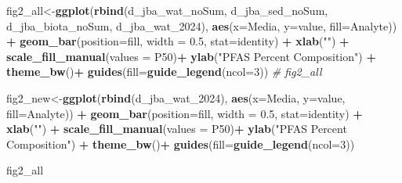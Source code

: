 \documentclass[
]{article}
\newenvironment{Shaded}{\begin{snugshade}}{\end{snugshade}}
\newcommand{\AttributeTok}[1]{\textcolor[rgb]{0.13,0.29,0.53}{#1}}
\newcommand{\CommentTok}[1]{\textcolor[rgb]{0.56,0.35,0.01}{\textit{#1}}}
\newcommand{\DecValTok}[1]{\textcolor[rgb]{0.00,0.00,0.81}{#1}}
\newcommand{\FloatTok}[1]{\textcolor[rgb]{0.00,0.00,0.81}{#1}}
\newcommand{\FunctionTok}[1]{\textcolor[rgb]{0.13,0.29,0.53}{\textbf{#1}}}
\newcommand{\NormalTok}[1]{#1}
\newcommand{\OtherTok}[1]{\textcolor[rgb]{0.56,0.35,0.01}{#1}}
\newcommand{\SpecialCharTok}[1]{\textcolor[rgb]{0.81,0.36,0.00}{\textbf{#1}}}
\newcommand{\StringTok}[1]{\textcolor[rgb]{0.31,0.60,0.02}{#1}}
\begin{document}
\begin{Shaded}
\begin{Highlighting}[]
\NormalTok{fig2\_all}\OtherTok{\textless{}{-}}\FunctionTok{ggplot}\NormalTok{(}\FunctionTok{rbind}\NormalTok{(d\_jba\_wat\_noSum,}
\NormalTok{                       d\_jba\_sed\_noSum,}
\NormalTok{                       d\_jba\_biota\_noSum,}
\NormalTok{                       d\_jba\_wat\_2024),}
       \FunctionTok{aes}\NormalTok{(}\AttributeTok{x=}\NormalTok{Media, }\AttributeTok{y=}\NormalTok{value, }\AttributeTok{fill=}\NormalTok{Analyte)) }\SpecialCharTok{+} 
  \FunctionTok{geom\_bar}\NormalTok{(}\AttributeTok{position=}\StringTok{\textquotesingle{}fill\textquotesingle{}}\NormalTok{, }\AttributeTok{width =} \FloatTok{0.5}\NormalTok{, }\AttributeTok{stat=}\StringTok{\textquotesingle{}identity\textquotesingle{}}\NormalTok{) }\SpecialCharTok{+}
  \FunctionTok{xlab}\NormalTok{(}\StringTok{""}\NormalTok{) }\SpecialCharTok{+}
  \FunctionTok{scale\_fill\_manual}\NormalTok{(}\AttributeTok{values =}\NormalTok{ P50)}\SpecialCharTok{+}
  \FunctionTok{ylab}\NormalTok{(}\StringTok{"PFAS Percent Composition"}\NormalTok{) }\SpecialCharTok{+}
  \FunctionTok{theme\_bw}\NormalTok{()}\SpecialCharTok{+}
  \FunctionTok{guides}\NormalTok{(}\AttributeTok{fill=}\FunctionTok{guide\_legend}\NormalTok{(}\AttributeTok{ncol=}\DecValTok{3}\NormalTok{))}
\CommentTok{\# fig2\_all}

\NormalTok{fig2\_new}\OtherTok{\textless{}{-}}\FunctionTok{ggplot}\NormalTok{(}\FunctionTok{rbind}\NormalTok{(d\_jba\_wat\_2024),}
       \FunctionTok{aes}\NormalTok{(}\AttributeTok{x=}\NormalTok{Media, }\AttributeTok{y=}\NormalTok{value, }\AttributeTok{fill=}\NormalTok{Analyte)) }\SpecialCharTok{+} 
  \FunctionTok{geom\_bar}\NormalTok{(}\AttributeTok{position=}\StringTok{\textquotesingle{}fill\textquotesingle{}}\NormalTok{, }\AttributeTok{width =} \FloatTok{0.5}\NormalTok{, }\AttributeTok{stat=}\StringTok{\textquotesingle{}identity\textquotesingle{}}\NormalTok{) }\SpecialCharTok{+}
  \FunctionTok{xlab}\NormalTok{(}\StringTok{""}\NormalTok{) }\SpecialCharTok{+}
  \FunctionTok{scale\_fill\_manual}\NormalTok{(}\AttributeTok{values =}\NormalTok{ P50)}\SpecialCharTok{+}
  \FunctionTok{ylab}\NormalTok{(}\StringTok{"PFAS Percent Composition"}\NormalTok{) }\SpecialCharTok{+}
  \FunctionTok{theme\_bw}\NormalTok{()}\SpecialCharTok{+}
  \FunctionTok{guides}\NormalTok{(}\AttributeTok{fill=}\FunctionTok{guide\_legend}\NormalTok{(}\AttributeTok{ncol=}\DecValTok{3}\NormalTok{))}

\NormalTok{fig2\_all}
\end{Highlighting}
\end{Shaded}
\end{document}
